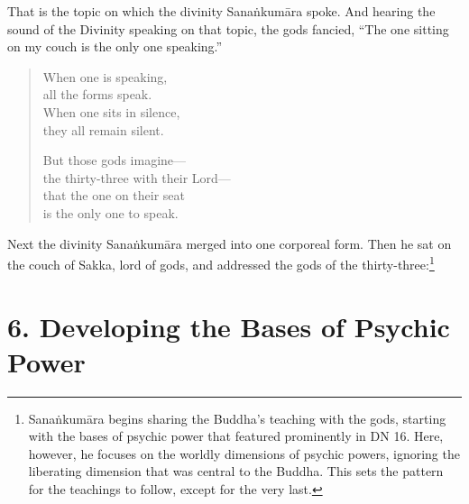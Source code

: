 \documentclass[12pt,openany]{book}%
\begin{document}
That is the topic on which the divinity \textsanskrit{Sanaṅkumāra} spoke. And hearing the sound of the Divinity speaking on that topic, the gods fancied, “The one sitting on my couch is the only one speaking.” 

\begin{verse}%
When one is speaking, \\
all the forms speak. \\
When one sits in silence, \\
they all remain silent. 

But those gods imagine—\\
the thirty-three with their Lord—\\
that the one on their seat \\
is the only one to speak. 

%
\end{verse}

Next the divinity \textsanskrit{Sanaṅkumāra} merged into one corporeal form. Then he sat on the couch of Sakka, lord of gods, and addressed the gods of the thirty-three:\footnote{\textsanskrit{Sanaṅkumāra} begins sharing the Buddha’s teaching with the gods, starting with the bases of psychic power that featured prominently in DN 16. Here, however, he focuses on the worldly dimensions of psychic powers, ignoring the liberating dimension that was central to the Buddha. This sets the pattern for the teachings to follow, except for the very last. } 

\section*{6. Developing the Bases of Psychic Power }
\end{document}
